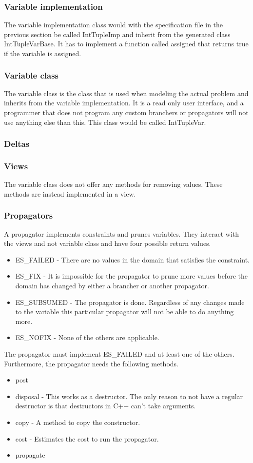 \documentclass[a4paper,11pt]{article}
\begin{document}
\subsubsection{Variable implementation}
The variable implementation class would with the specification file in the previous section be called IntTupleImp and inherit from the generated class IntTupleVarBase. It has to implement a function called assigned that returns true if the variable is assigned.
\subsubsection{Variable class}
The variable class is the class that is used when modeling the actual problem and inherits from the variable implementation. It is a read only user interface, and a programmer that does not program any custom branchers or propagators will not use anything else than this. This class would be called IntTupleVar.

\subsubsection{Deltas}
\subsubsection{Views}
The variable class does not offer any methods for removing values. These methods are instead implemented in a view.
\subsubsection{Propagators}
A propagator implements constraints and prunes variables. They interact with the views and not variable class and have four possible return values.
\begin{itemize}
\item{ES\_FAILED} - There are no values in the domain that satisfies the constraint.
\item{ES\_FIX} - It is impossible for the propagator to prune more values before the domain has changed by either a brancher or another propagator.
\item{ES\_SUBSUMED} - The propagator is done. Regardless of any changes made to the variable this particular propagator will not be able to do anything more.
\item{ES\_NOFIX} - None of the others are applicable.
\end{itemize}
The propagator must implement ES\_FAILED and at least one of the others. Furthermore, the propagator needs the following methods.
\begin{itemize}
\item{post}
\item{disposal} - This works as a destructor. The only reason to not have a regular destructor is that destructors in C++ can't take arguments.
\item{copy} - A method to copy the constructor.
\item{cost} - Estimates the cost to run the propagator.
\item{propagate}
\end{itemize}
\end{document}

